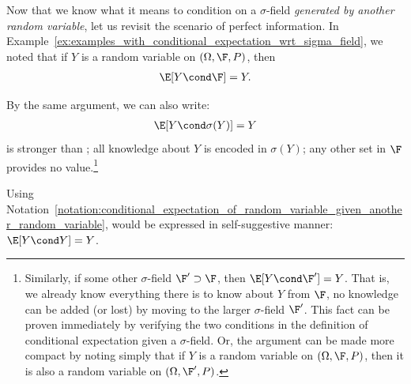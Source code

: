 \documentclass{article} %
\begin{document}
\begin{remark}
Now that we know what it means to condition on a $\sigma$-field \textit{generated by another random variable}, let us revisit the scenario of perfect information. In  Example~\ref{ex:examples_with_conditional_expectation_wrt_sigma_field},  we noted that if $Y$ is a random variable on $(\Omega, \F, P)$, then	
\begin{align}
\E[Y \cond \F] = Y.
\label{eqn:perfect_information_again}	
\end{align}
  
By the same argument, we can also write: 
\begin{align}
\E[Y \cond \sigma(Y)] = Y
\label{eqn:perfect_information_a_stronger_statement}	
\end{align}
	is stronger than ; all knowledge about $Y$ is encoded in $\sigma(Y)$; any other set in $\F$ provides no value.\footnote{Similarly, if some other $\sigma$-field $\F' \supset \F$, then $\E[Y \cond \F'] = Y$.  That is, we already know everything there is to know about $Y$ from $\F$, no knowledge can be added (or lost) by moving to the larger $\sigma$-field $\F'$.  This fact can be proven immediately by verifying the two conditions in the definition of conditional expectation given a $\sigma$-field.  Or, the argument can be made more compact by noting simply that if $Y$ is a random variable on $(\Omega, \F, P)$, then it is also a random variable on $(\Omega, \F', P)$.} 

Using Notation~\ref{notation:conditional_expectation_of_random_variable_given_another_random_variable},  would be expressed in self-suggestive manner: $\E[Y \cond Y] = Y$.
\end{remark}
\end{document}
